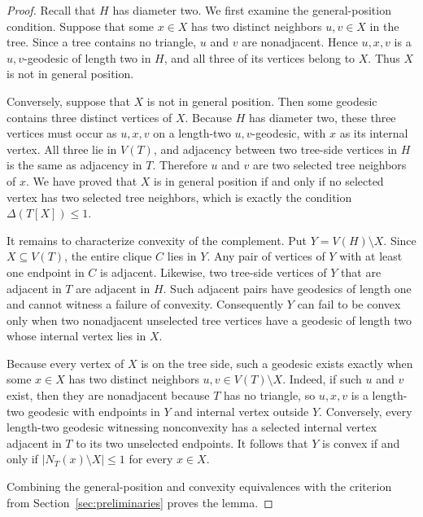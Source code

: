 \documentclass[preprint,12pt]{elsarticle}
\numberwithin{equation}{section}
\begin{document}
\begin{proof}
Recall that \(H\) has diameter two. We first examine the
general-position condition. Suppose that some \(x\in X\) has two
distinct neighbors \(u,v\in X\) in the tree. Since a tree contains no
triangle, \(u\) and \(v\) are nonadjacent. Hence \(u,x,v\) is a
\(u,v\)-geodesic of length two in \(H\), and all three of its vertices
belong to \(X\). Thus \(X\) is not in general position.

Conversely, suppose that \(X\) is not in general position. Then some
geodesic contains three distinct vertices of \(X\). Because \(H\) has
diameter two, these three vertices must occur as \(u,x,v\) on a
length-two \(u,v\)-geodesic, with \(x\) as its internal vertex. All
three lie in \(V(T)\), and adjacency between two tree-side vertices in
\(H\) is the same as adjacency in \(T\). Therefore \(u\) and \(v\) are
two selected tree neighbors of \(x\). We have proved that \(X\) is in
general position if and only if no selected vertex has two selected tree
neighbors, which is exactly the condition \(\Delta(T[X])\le 1\).

It remains to characterize convexity of the complement. Put
\(Y=V(H)\setminus X\). Since \(X\subseteq V(T)\), the entire clique
\(C\) lies in \(Y\). Any pair of vertices of \(Y\) with at least one
endpoint in \(C\) is adjacent. Likewise, two tree-side vertices of \(Y\)
that are adjacent in \(T\) are adjacent in \(H\). Such adjacent pairs
have geodesics of length one and cannot witness a failure of convexity.
Consequently \(Y\) can fail to be convex only when two nonadjacent
unselected tree vertices have a geodesic of length two whose internal
vertex lies in \(X\).

Because every vertex of \(X\) is on the tree side, such a geodesic
exists exactly when some \(x\in X\) has two distinct neighbors
\(u,v\in V(T)\setminus X\). Indeed, if such \(u\) and \(v\) exist, then
they are nonadjacent because \(T\) has no triangle, so \(u,x,v\) is a
length-two geodesic with endpoints in \(Y\) and internal vertex outside
\(Y\). Conversely, every length-two geodesic witnessing nonconvexity has
a selected internal vertex adjacent in \(T\) to its two unselected
endpoints. It follows that \(Y\) is convex if and only if
\(|N_T(x)\setminus X|\le 1\) for every \(x\in X\).

Combining the general-position and convexity equivalences with the
criterion from Section~\ref{sec:preliminaries} proves the lemma.
\end{proof}
\end{document}

